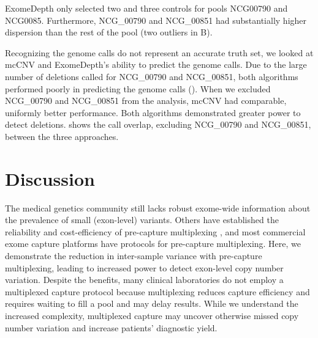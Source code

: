 \documentclass{bmcart}\usepackage[]{graphicx}\usepackage[]{color}
\begin{document}
ExomeDepth only selected two and three controls  for pools NCG\replaced{\_}{ }00790 and NCG\replaced{\_}{ }0085.
Furthermore, NCG\_00790 and NCG\_00851 had substantially higher dispersion than the rest of the pool (two outliers in B).

Recognizing the genome calls do not represent an accurate truth set, we looked at mcCNV and ExomeDepth's ability to predict the genome calls.
Due to the large number of deletions called for NCG\_00790 and NCG\_00851, both algorithms performed poorly in predicting the genome calls ().
When we excluded NCG\_00790 and NCG\_00851 from the analysis, mcCNV had comparable, uniformly better performance.
Both algorithms demonstrated greater power to detect deletions.
 shows the call overlap, excluding NCG\_00790 and NCG\_00851, between the three approaches.


\section{Discussion}

The medical genetics community still lacks robust exome-wide information about the prevalence of small (exon-level) variants.
Others have established the reliability and cost-efficiency of pre-capture multiplexing \cite{ramos:2012aa,wesolowska:2011aa,shearer:2012aa,neiman:2012aa,rohland:2012aa}, and most commercial exome capture platforms have protocols for pre-capture multiplexing.
Here, we demonstrate the reduction in inter-sample variance with pre-capture multiplexing, leading to increased power to detect exon-level copy number variation.
Despite the benefits, many clinical laboratories do not employ a multiplexed capture protocol because multiplexing reduces capture efficiency \cite{trost:2018aa} and requires waiting to fill a pool and may delay results.
While we understand the increased complexity, multiplexed capture may uncover otherwise missed copy number variation and increase patients' diagnostic yield.
\end{document}
